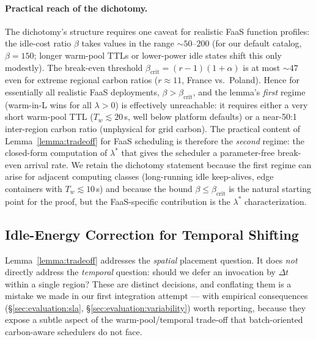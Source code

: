 \paragraph{Practical reach of the dichotomy.} The dichotomy's
structure requires one caveat for realistic FaaS function profiles:
the idle-cost ratio $\beta$ takes values in the range $\sim 50$--$200$
(for our default  catalog, $\beta = 150$;
longer warm-pool TTLs or lower-power idle states shift this only
modestly). The break-even threshold $\beta_{\mathrm{crit}} =
(r-1)(1+\alpha)$ is at most $\sim 47$ even for extreme regional carbon
ratios ($r \approx 11$, France vs.\ Poland). Hence for essentially
all realistic FaaS deployments, $\beta > \beta_{\mathrm{crit}}$, and
the lemma's \emph{first} regime (warm-in-L wins for all $\lambda > 0$)
is effectively unreachable: it requires either a very short warm-pool
TTL ($T_w \lesssim 20$\,s, well below platform defaults) or a
near-50:1 inter-region carbon ratio (unphysical for grid carbon). The
practical content of Lemma~\ref{lemma:tradeoff} for FaaS scheduling
is therefore the \emph{second} regime: the closed-form computation of
$\lambda^*$ that gives the scheduler a parameter-free break-even
arrival rate. We retain the dichotomy statement because the first
regime can arise for adjacent computing classes (long-running idle
keep-alives, edge containers with $T_w \lesssim 10$\,s) and because
the bound $\beta \le \beta_{\mathrm{crit}}$ is the natural starting
point for the proof, but the FaaS-specific contribution is the
$\lambda^*$ characterization.

\subsection{Idle-Energy Correction for Temporal Shifting}
\label{sec:tradeoff:idle}

Lemma~\ref{lemma:tradeoff} addresses the \emph{spatial} placement
question. It does \emph{not} directly address the \emph{temporal}
question: should we defer an invocation by $\Delta t$ within a single
region? These are distinct decisions, and conflating them is a
mistake we made in our first integration attempt --- with empirical
consequences (\S\ref{sec:evaluation:sla},
\S\ref{sec:evaluation:variability}) worth reporting, because they
expose a subtle aspect of the warm-pool/temporal trade-off that
batch-oriented carbon-aware schedulers do not face.

